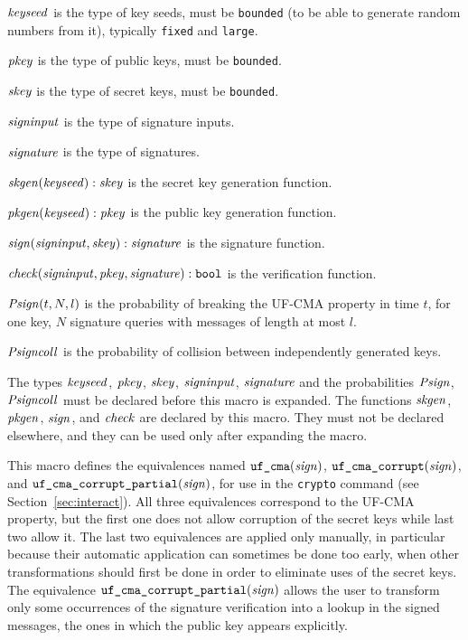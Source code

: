 \documentclass{article}
\begin{document}
\begin{itemize}
   $\mathit{keyseed}$ is the type of key seeds, must be \texttt{bounded} (to be able to generate random numbers from it), typically \texttt{fixed} and \texttt{large}.

   $\mathit{pkey}$ is the type of public keys, must be \texttt{bounded}.

   $\mathit{skey}$ is the type of secret keys, must be \texttt{bounded}.

  $\mathit{signinput}$ is the type of signature inputs.

   $\mathit{signature}$ is the type of signatures.

   $\mathit{skgen}(\mathit{keyseed}): \mathit{skey}$ is the secret key generation function.

   $\mathit{pkgen}(\mathit{keyseed}): \mathit{pkey}$ is the public key generation function.

   $\mathit{sign}(\mathit{signinput}, \mathit{skey}): \mathit{signature}$ is the signature function.

   $\mathit{check}(\mathit{signinput}, \mathit{pkey}, \mathit{signature}): \texttt{bool}$ is the
  verification function.

   $\mathit{Psign}(t, N, l)$ is the probability of breaking the UF-CMA property
   in time $t$, for one key, $N$ signature queries with messages of length
   at most $l$.

   $\mathit{Psigncoll}$ is the probability of collision between independently generated keys.

   The types $\mathit{keyseed}$, $\mathit{pkey}$, $\mathit{skey}$, $\mathit{signinput}$,
   $\mathit{signature}$ and the probabilities $\mathit{Psign}$, $\mathit{Psigncoll}$ must
   be declared before this macro is expanded. The functions
   $\mathit{skgen}$, $\mathit{pkgen}$, $\mathit{sign}$, and $\mathit{check}$ are declared by this
   macro. They must not be declared elsewhere, and they can be used
   only after expanding the macro.

   This macro defines the equivalences named
   $\texttt{uf\_cma}(\mathit{sign})$,
   $\texttt{uf\_cma\_corrupt}(\mathit{sign})$, and
   $\texttt{uf\_cma\_corrupt\_partial}(\mathit{sign})$, for use in the
   \texttt{crypto} command (see Section~\ref{sec:interact}).
   All three equivalences correspond to the UF-CMA property, but the first one 
   does not allow corruption of the secret keys while last two allow it.
   The last two equivalences are applied only manually, in particular because their automatic
   application can sometimes be done too early, when other transformations
   should first be done in order to eliminate uses of the secret keys.
   The equivalence $\texttt{uf\_cma\_corrupt\_partial}(\mathit{sign})$ allows the
   user to transform only some occurrences of the signature verification into a 
   lookup in the signed messages, the ones in which the public key appears explicitly.  


\end{itemize}
\end{document}
